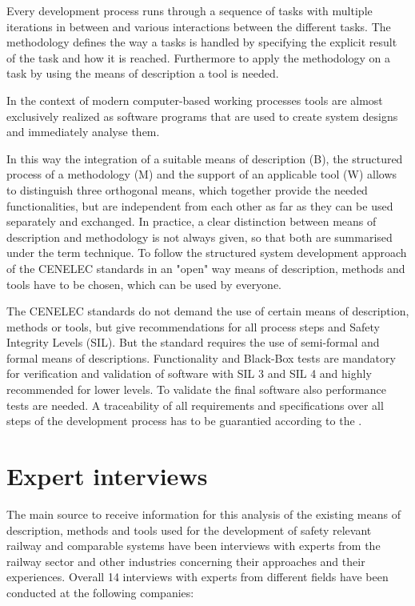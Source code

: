 \documentclass{./template/openetcs_report}
\begin{document}
 Every development process runs through a sequence of tasks with multiple iterations in between and various interactions between the different tasks. The methodology defines the way a tasks is handled by specifying the explicit result of the task and how it is reached. Furthermore to apply the methodology on a task by using the means of description a tool is needed. 

In the context of modern computer-based working processes tools are almost exclusively realized as software programs that are used to create system designs and immediately analyse them. 

In this way the integration of a suitable means of description (B),  the structured process of a methodology (M) and the support of an applicable tool (W) allows to distinguish three orthogonal means, which together provide the needed functionalities, but are independent from each other as far as they can be used separately and exchanged. In practice, a clear distinction between means of description and methodology is not always given, so that both are summarised under the term technique. To follow the structured system development approach of the CENELEC standards in an "open" way means of description, methods and tools have to be chosen, which can be used by everyone. 

The CENELEC standards do not demand the use of certain means of description, methods or tools, but give recommendations for all process steps and Safety Integrity Levels (SIL). But the standard requires the use of semi-formal and formal means of descriptions. Functionality and Black-Box tests are mandatory for verification and validation of software with SIL 3 and SIL 4 and highly recommended for lower levels. To validate the final software also performance tests are needed. A traceability of all requirements and specifications over all steps of the development process has to be guarantied according to the \citeauthor{EN50128:2011}. 

\chapter{Expert interviews}

The main source to receive information for this analysis of the existing means of description, methods and tools used for the  development of safety relevant railway and comparable systems have been interviews with experts from the railway sector and other  industries concerning their approaches and their experiences. Overall 14 interviews  with experts from different fields have been conducted  at the following companies:
\end{document}
